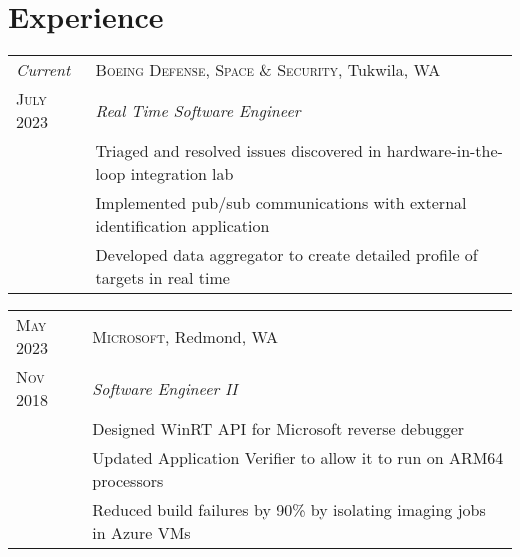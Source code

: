 \documentclass[a4paper,12pt]{article} %
\begin{document}
\pagestyle{empty} %


\par{\par}
\par{\par}

\vspace{10pt} %


\section{Experience}

\begin{tabular}{R{2.1cm}|L{13.0cm}}
\emph{Current} & \textsc{Boeing Defense, Space \& Security}, Tukwila, WA \\
\textsc{July 2023} & \emph{Real Time Software Engineer} \\
& \footnotesize{Triaged and resolved issues discovered in hardware-in-the-loop integration lab} \\
& \footnotesize{Implemented pub/sub communications with external identification application} \\
& \footnotesize{Developed data aggregator to create detailed profile of targets in real time} \\

\end{tabular}


\begin{tabular}{R{2.1cm}|L{13.0cm}}
\textsc{May 2023} & \textsc{Microsoft}, Redmond, WA \\
\textsc{Nov 2018} & \emph{Software Engineer II} \\
& \footnotesize{Designed WinRT API for Microsoft reverse debugger} \\
& \footnotesize{Updated Application Verifier to allow it to run on ARM64 processors} \\
& \footnotesize{Reduced build failures by 90\% by isolating imaging jobs in
  Azure VMs} \\
\end{tabular}
\end{document}
